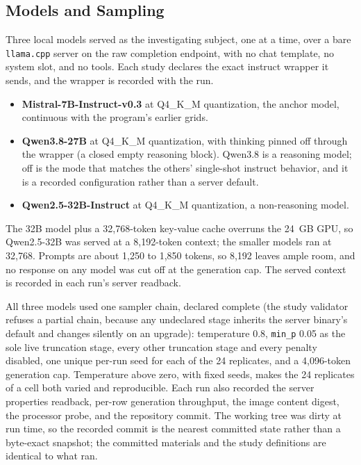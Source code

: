 \documentclass[11pt,a4paper]{article}
\begin{document}
\subsection{Models and Sampling}\label{sec:sampling}

Three local models served as the investigating subject, one at a time, over a bare
\texttt{llama.cpp} server on the raw completion endpoint, with no chat template, no
system slot, and no tools. Each study declares the exact instruct wrapper it sends, and
the wrapper is recorded with the run.

\begin{itemize}
  \item \textbf{Mistral-7B-Instruct-v0.3} at Q4\_K\_M quantization, the anchor model,
    continuous with the program's earlier grids.
  \item \textbf{Qwen3.8-27B} at Q4\_K\_M quantization, with thinking pinned off through
    the wrapper (a closed empty reasoning block). Qwen3.8 is a reasoning model; off is the
    mode that matches the others' single-shot instruct behavior, and it is a recorded
    configuration rather than a server default.
  \item \textbf{Qwen2.5-32B-Instruct} at Q4\_K\_M quantization, a non-reasoning model.
\end{itemize}

The 32B model plus a 32{,}768-token key-value cache overruns the 24~GB GPU, so
Qwen2.5-32B was served at a 8{,}192-token context; the smaller models ran at 32{,}768.
Prompts are about 1{,}250 to 1{,}850 tokens, so 8{,}192 leaves ample room, and no
response on any model was cut off at the generation cap. The served context is recorded
in each run's server readback.

All three models used one sampler chain, declared complete (the study validator refuses a
partial chain, because any undeclared stage inherits the server binary's default and
changes silently on an upgrade): temperature 0.8, \texttt{min\_p} 0.05 as the sole live
truncation stage, every other truncation stage and every penalty disabled, one unique
per-run seed for each of the 24 replicates, and a 4{,}096-token generation cap.
Temperature above zero, with fixed seeds, makes the 24 replicates of a cell both varied
and reproducible. Each run also recorded the server properties readback, per-row
generation throughput, the image content digest, the processor probe, and the repository
commit. The working tree was dirty at run time, so the recorded commit is the nearest
committed state rather than a byte-exact snapshot; the committed materials and the study
definitions are identical to what ran.
\end{document}
